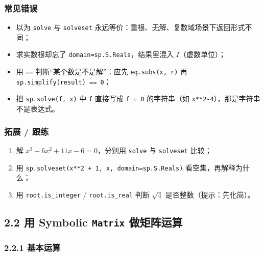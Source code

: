 \subsubsection{常见错误}\label{ux5e38ux89c1ux9519ux8bef-12}

\begin{itemize}
\tightlist
\item
  以为 \texttt{solve} 与 \texttt{solveset}
  永远等价：重根、无解、复数域场景下返回形式不同；
\item
  求实数根却忘了 \texttt{domain=sp.S.Reals}，结果里混入
  \(I\)（虚数单位）；
\item
  用 \texttt{==} 判断``某个数是不是解''：应先 \texttt{eq.subs(x,\ r)} 再
  \texttt{sp.simplify(result)\ ==\ 0}；
\item
  把 \texttt{sp.solve(f,\ x)} 中 \texttt{f} 直接写成 \texttt{f\ =\ 0}
  的字符串（如
  \texttt{\textquotesingle{}x**2-4\textquotesingle{}}），那是字符串不是表达式。
\end{itemize}

\subsubsection{拓展 / 跟练}\label{ux62d3ux5c55-ux8ddfux7ec3-1}

\begin{enumerate}
\def\labelenumi{\arabic{enumi}.}
\tightlist
\item
  解 \(x^3-6x^2+11x-6=0\)，分别用 \texttt{solve} 与 \texttt{solveset}
  比较；
\item
  用 \texttt{sp.solveset(x**2\ +\ 1,\ x,\ domain=sp.S.Reals)}
  看空集，再解释为什么；
\item
  用 \texttt{root.is\_integer} / \texttt{root.is\_real} 判断
  \(\sqrt{4}\) 是否整数（提示：先化简）。
\end{enumerate}

\subsection{\texorpdfstring{2.2 用 Symbolic \texttt{Matrix}
做矩阵运算}{2.2 用 Symbolic Matrix 做矩阵运算}}\label{ux7528-symbolic-matrix-ux505aux77e9ux9635ux8fd0ux7b97}

\subsubsection{2.2.1 基本运算}\label{ux57faux672cux8fd0ux7b97}

